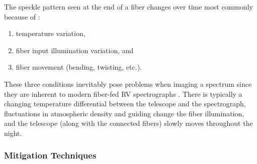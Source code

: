 \documentclass[11pt]{article}
\begin{document}
The speckle pattern seen at the end of a fiber changes over time most commonly because of \citep{Epworth1978}:
\begin{enumerate}
\item temperature variation,
\item fiber input illumination variation, and
\item fiber movement (bending, twisting, etc.).
\end{enumerate}
These three conditions inevitably pose problems when imaging a spectrum since they are inherent to modern fiber-fed RV spectrographs \citep{Baudrand2001, Mahadevan2014}. There is typically a changing temperature differential between the telescope and the spectrograph, fluctuations in atmospheric density and guiding change the fiber illumination, and the telescope (along with the connected fibers) slowly moves throughout the night.

\subsubsection{Mitigation Techniques}
\label{subsec:mitigation}
\end{document}
